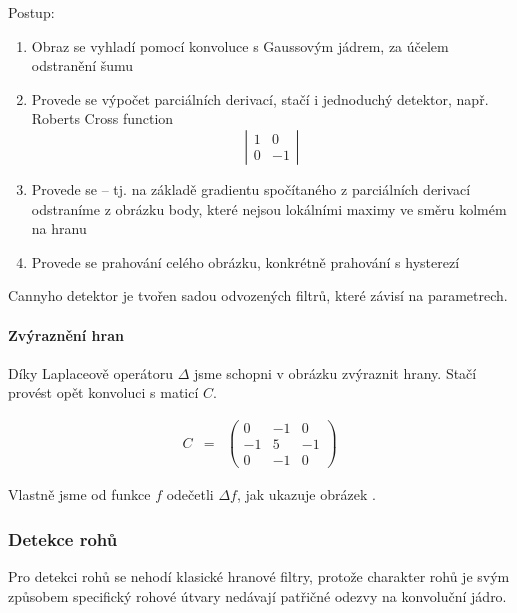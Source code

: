\begin{enumerate}
Postup:

\begin{enumerate} 
\item Obraz se vyhladí pomocí konvoluce s Gaussovým jádrem, za účelem odstranění šumu
\item Provede se výpočet parciálních derivací, stačí i jednoduchý detektor, např. Roberts Cross function
$$\left|\begin{array}{cc}1&0\\0&-1\end{array}\right|$$
\item Provede se  -- tj. na základě gradientu spočítaného z parciálních derivací odstraníme
z obrázku body, které nejsou lokálními maximy ve směru kolmém na hranu
\item Provede se prahování celého obrázku, konkrétně prahování s hysterezí
\end{enumerate}

\end{enumerate}



Cannyho detektor je tvořen sadou odvozených filtrů, které závisí na parametrech.
\paragraph{Zvýraznění hran} 

Díky Laplaceově operátoru $\Delta$ jsme schopni v obrázku zvýraznit hrany. 
Stačí provést opět konvoluci s maticí $C$.

\begin{eqnarray}
C&=&\left(\begin{array}{ccc}0&-1&0\\-1&5&-1\\0&-1&0\end{array}\right)
\end{eqnarray}

Vlastně jsme od funkce $f$ odečetli $\Delta f$, jak ukazuje obrázek .


\subsubsection{Detekce rohů}
Pro detekci rohů se nehodí klasické hranové filtry, protože charakter rohů je svým způsobem
specifický rohové útvary nedávají patřičné odezvy na konvoluční jádro.

